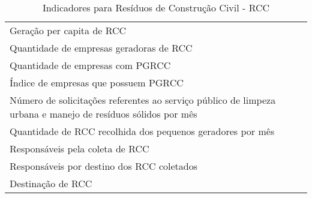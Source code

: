 \begin{table}[h!]
  \centering
  \caption{Indicadores para Resíduos de Construção Civil - RCC}
    \begin{tabular}{|p{25em}|}
    \rowcolor[rgb]{ .984,  .831,  .706} \multicolumn{1}{P{25em}}{RESÍDUOS DE CONSTRUÇÃO CIVIL} \\
    \midrule
    Geração per capita de RCC \\
    \midrule
    Quantidade de empresas geradoras de RCC \\
    \midrule
    Quantidade de empresas com PGRCC \\
    \midrule
    Índice de empresas que possuem PGRCC \\
    \midrule
    Número de solicitações referentes ao serviço público de limpeza urbana e manejo de resíduos sólidos por mês   \\
    \midrule
    Quantidade de RCC recolhida dos pequenos geradores por mês \\
    \midrule
    Responsáveis pela coleta de RCC \\
    \midrule
    Responsáveis por destino dos RCC coletados \\
    \midrule
    Destinação de RCC \\
    \bottomrule
    \end{tabular}%
  \label{tab:ind_rcc}%
\end{table}%
